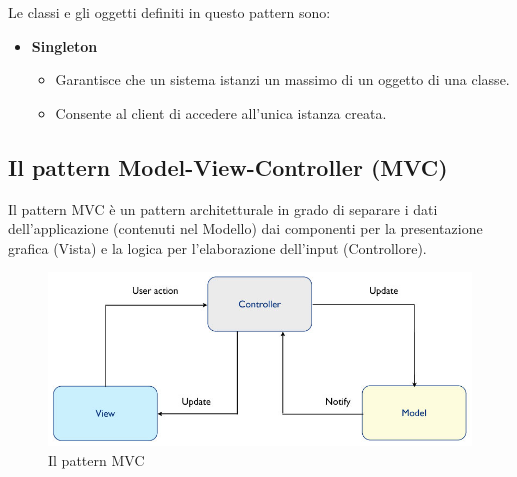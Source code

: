 \documentclass[11pt]{article}
\begin{document}
Le classi e gli oggetti definiti in questo pattern sono:
\begin{itemize}
	\item \textbf{Singleton}
	\begin{itemize}
		\item Garantisce che un sistema istanzi un massimo di un oggetto di una classe.
		\item Consente al client di accedere all'unica istanza creata.
	\end{itemize}
\end{itemize}

\subsection{Il pattern Model-View-Controller (MVC)}
Il pattern MVC è un pattern architetturale in grado di separare i dati dell'applicazione (contenuti nel Modello) dai componenti per la presentazione grafica (Vista) e la
logica per l'elaborazione dell'input (Controllore).

\begin{figure}[H]
	\centering
	\includegraphics[scale=0.40]{images/mvc.jpg}
	\caption{Il pattern MVC}
	\label{mvc}
\end{figure}
\end{document}
